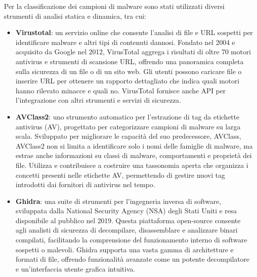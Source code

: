 Per la classificazione dei campioni di malware sono stati utilizzati diversi strumenti di analisi statica e dinamica, tra cui:
\begin{itemize}
    \item \textbf{Virustotal}: un servizio online che consente l'analisi di file e URL sospetti per identificare malware e altri tipi di contenuti dannosi. Fondato nel 2004 e acquisito da Google nel 2012, VirusTotal aggrega i risultati di oltre 70 motori antivirus e strumenti di scansione URL, offrendo una panoramica completa sulla sicurezza di un file o di un sito web. Gli utenti possono caricare file o inserire URL per ottenere un rapporto dettagliato che indica quali motori hanno rilevato minacce e quali no. VirusTotal fornisce anche API per l'integrazione con altri strumenti e servizi di sicurezza.
    \item \textbf{AVClass2}: uno strumento automatico per l'estrazione di tag da etichette antivirus (AV), progettato per categorizzare campioni di malware su larga scala. Sviluppato per migliorare le capacità del suo predecessore, AVClass, AVClass2 non si limita a identificare solo i nomi delle famiglie di malware, ma estrae anche informazioni su classi di malware, comportamenti e proprietà dei file. Utilizza e contribuisce a costruire una tassonomia aperta che organizza i concetti presenti nelle etichette AV, permettendo di gestire nuovi tag introdotti dai fornitori di antivirus nel tempo.
    \item \textbf{Ghidra}:  una suite di strumenti per l'ingegneria inversa di software, sviluppata dalla National Security Agency (NSA) degli Stati Uniti e resa disponibile al pubblico nel 2019. Questa piattaforma open-source consente agli analisti di sicurezza di decompilare, disassemblare e analizzare binari compilati, facilitando la comprensione del funzionamento interno di software sospetti o malevoli. Ghidra supporta una vasta gamma di architetture e formati di file, offrendo funzionalità avanzate come un potente decompilatore e un'interfaccia utente grafica intuitiva.
\end{itemize}

